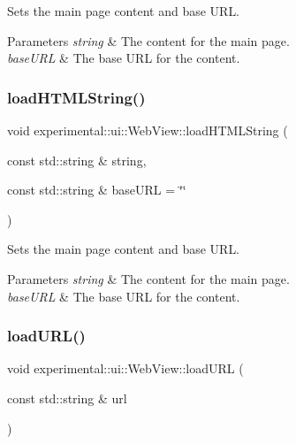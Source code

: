 Sets the main page content and base U\+RL.


\begin{DoxyParams}{Parameters}
{\em string} & The content for the main page. \\
\hline
{\em base\+U\+RL} & The base U\+RL for the content. \\
\hline
\end{DoxyParams}
\mbox{\label{classexperimental_1_1ui_1_1WebView_aead3a24dfa6db7bb8175d3616a415c20}} 
\subsubsection{\texorpdfstring{load\+H\+T\+M\+L\+String()}{loadHTMLString()}\hspace{0.1cm}{\footnotesize\ttfamily [2/2]}}
{\footnotesize\ttfamily void experimental\+::ui\+::\+Web\+View\+::load\+H\+T\+M\+L\+String (\begin{DoxyParamCaption}\item[{const std\+::string \&}]{string,  }\item[{const std\+::string \&}]{base\+U\+RL = {\ttfamily \char`\"{}\char`\"{}} }\end{DoxyParamCaption})}

Sets the main page content and base U\+RL.


\begin{DoxyParams}{Parameters}
{\em string} & The content for the main page. \\
\hline
{\em base\+U\+RL} & The base U\+RL for the content. \\
\hline
\end{DoxyParams}
\mbox{\label{classexperimental_1_1ui_1_1WebView_ac6824942bb8915c2b662ce185e9c82ee}} 
\subsubsection{\texorpdfstring{load\+U\+R\+L()}{loadURL()}\hspace{0.1cm}{\footnotesize\ttfamily [1/3]}}
{\footnotesize\ttfamily void experimental\+::ui\+::\+Web\+View\+::load\+U\+RL (\begin{DoxyParamCaption}\item[{const std\+::string \&}]{url }\end{DoxyParamCaption})}

